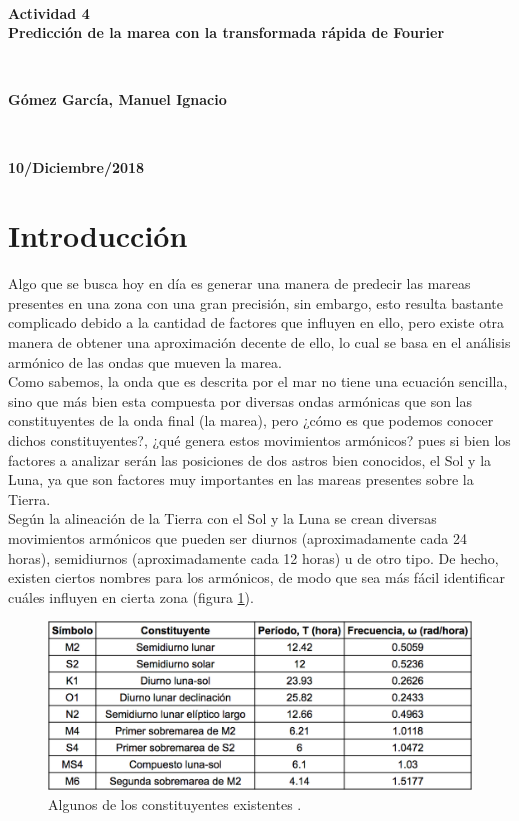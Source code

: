 \documentclass[12pt]{article}
\begin{document}
\begin{titlepage}
\HRule \\

{\huge \bfseries Actividad 4\\
Predicción de la marea con la transformada rápida de Fourier\\}

 \HRule \\ [1cm]
\vfill

\begin{minipage}{0.6\textwidth}
	\raggedright
	\large
	\textbf{Gómez García, Manuel Ignacio}
\end{minipage}
~
\begin{minipage}{0.35\textwidth}
	\raggedleft
	\large
	\textbf{10/Diciembre/2018}
\end{minipage}

\end{titlepage}

\section{Introducción}

\noindent Algo que se busca hoy en día es generar una manera de predecir las mareas presentes en una zona con una gran precisión, sin embargo, esto resulta bastante complicado debido a la cantidad de factores que influyen en ello, pero existe otra manera de obtener una aproximación decente de ello, lo cual se basa en el análisis armónico de las ondas que mueven la marea. \\
\indent Como sabemos, la onda que es descrita por el mar no tiene una ecuación sencilla, sino que más bien esta compuesta por diversas ondas armónicas que son las constituyentes de la onda final (la marea), pero ¿cómo es que podemos conocer dichos constituyentes?, ¿qué genera estos movimientos armónicos? pues si bien los factores a analizar serán las posiciones de dos astros bien conocidos, el Sol y la Luna, ya que son factores muy importantes en las mareas presentes sobre la Tierra. \\
\indent Según la alineación de la Tierra con el Sol y la Luna se crean diversas movimientos armónicos que pueden ser diurnos (aproximadamente cada 24 horas), semidiurnos (aproximadamente cada 12 horas) u de otro tipo. De hecho, existen ciertos nombres para los armónicos, de modo que sea más fácil identificar cuáles influyen en cierta zona (figura \ref{fig:constituyentes}).

\begin{figure}[h!]
	\center
	\includegraphics[scale=.3]{./Images/constituyentes}
	\caption{\label{fig:constituyentes} Algunos de los constituyentes existentes \cite{Verde}.}
\end{figure}
\end{document}
